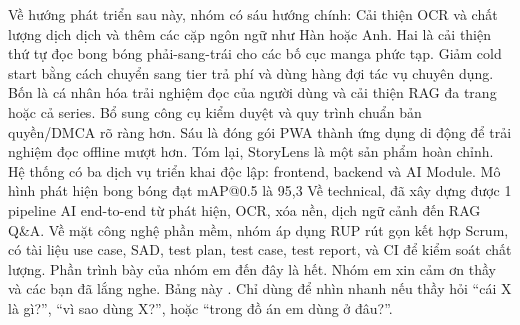 {}
\markdownRendererSectionEnd \markdownRendererSectionBegin
{}\markdownRendererInterblockSeparator
{}Về hướng phát triển sau này, nhóm có sáu hướng chính:\markdownRendererParagraphSeparator
{}Cải thiện OCR và chất lượng dịch dịch và thêm các cặp ngôn ngữ như Hàn hoặc Anh.\markdownRendererParagraphSeparator
{}Hai là cải thiện thứ tự đọc bong bóng phải-sang-trái cho các bố cục manga phức tạp.\markdownRendererParagraphSeparator
{}Giảm cold start bằng cách chuyển sang tier trả phí và dùng hàng đợi tác vụ chuyên dụng.\markdownRendererParagraphSeparator
{}Bốn là cá nhân hóa trải nghiệm đọc của người dùng và cải thiện RAG đa trang hoặc cả series.\markdownRendererParagraphSeparator
{}Bổ sung công cụ kiểm duyệt và quy trình chuẩn bản quyền/DMCA rõ ràng hơn.\markdownRendererParagraphSeparator
{}Sáu là đóng gói PWA thành ứng dụng di động để trải nghiệm đọc offline mượt hơn.\markdownRendererInterblockSeparator
{}
\markdownRendererSectionEnd \markdownRendererSectionBegin
{}\markdownRendererInterblockSeparator
{}Tóm lại, StoryLens là một sản phẩm hoàn chỉnh.\markdownRendererParagraphSeparator
{}Hệ thống có ba dịch vụ triển khai độc lập: frontend, backend và AI Module. Mô hình phát hiện bong bóng đạt mAP@0.5 là 95,3\markdownRendererParagraphSeparator
{}Về technical, đã xây dựng được 1 pipeline AI end-to-end từ phát hiện, OCR, xóa nền, dịch ngữ cảnh đến RAG Q&A.\markdownRendererParagraphSeparator
{}Về mặt công nghệ phần mềm, nhóm áp dụng RUP rút gọn kết hợp Scrum, có tài liệu use case, SAD, test plan, test case, test report, và CI để kiểm soát chất lượng.\markdownRendererInterblockSeparator
{}
\markdownRendererSectionEnd \markdownRendererSectionBegin
{}\markdownRendererInterblockSeparator
{}Phần trình bày của nhóm em đến đây là hết. Nhóm em xin cảm ơn thầy và các bạn đã lắng nghe.\markdownRendererInterblockSeparator
{}\markdownRendererThematicBreak{}\markdownRendererInterblockSeparator
{}
\markdownRendererSectionEnd 
\markdownRendererSectionEnd \markdownRendererSectionBegin
{}\markdownRendererInterblockSeparator
{}Bảng này . Chỉ dùng để nhìn nhanh nếu thầy hỏi “cái X là gì?”, “vì sao dùng X?”, hoặc “trong đồ án em dùng ở đâu?”.\markdownRendererInterblockSeparator
